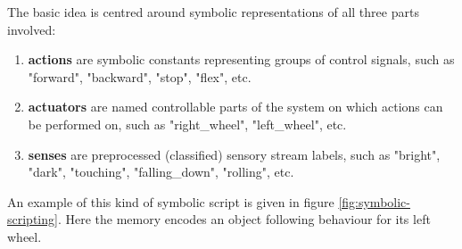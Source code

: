 \documentclass[journal]{journal}
\begin{document}
The basic idea is centred around symbolic representations of all three parts involved:
\begin{enumerate}
	\item \textbf{actions} are symbolic constants representing groups of control signals, such as "forward", "backward", "stop", "flex", etc.
	
	\item \textbf{actuators} are named controllable parts of the system on which actions can be performed on, such as "right\_wheel", "left\_wheel", etc.
	
	\item \textbf{senses} are preprocessed (classified) sensory stream labels, such as "bright", "dark", "touching", "falling\_down", "rolling", etc.
\end{enumerate}

An example of this kind of symbolic script is given in figure \ref{fig:symbolic-scripting}. Here the memory encodes an object following behaviour for its left wheel.
\end{document}
